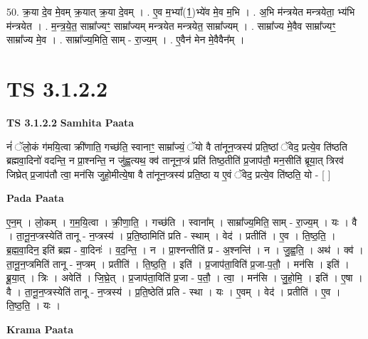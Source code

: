 \documentclass[17pt]{extarticle}
\begin{document}
50. क्र॒या दे॒व मे॒वम् क्र॒यात् क्र॒या दे॒वम् । . ए॒व म॒भ्या᳚(1॒)भ्ये॑व मे॒व म॒भि । . अ॒भि म॑न्त्रयेत मन्त्रयेता॒ भ्य॑भि म॑न्त्रयेत । . म॒न्त्र॒ये॒त॒ साम्रा᳚ज्यꣳ॒॒ साम्रा᳚ज्यम् मन्त्रयेत मन्त्रयेत॒ साम्रा᳚ज्यम् । . साम्रा᳚ज्य मे॒वैव साम्रा᳚ज्यꣳ॒॒ साम्रा᳚ज्य मे॒व । . साम्रा᳚ज्य॒मिति॒ साम् - रा॒ज्य॒म् । . ए॒वैन॑ मेन मे॒वैवैन᳚म् । \newline
\pagebreak
{}

\section{ TS 3.1.2.2 }

\textbf{TS 3.1.2.2 } \newline
\textbf{Samhita Paata} \newline

नं॑ ॅलो॒कं ग॑मयि॒त्वा क्री॑णाति॒ गच्छ॑ति॒ स्वानाꣳ॒॒ साम्रा᳚ज्यं॒ ॅयो वै ता॑नून॒प्त्रस्य॑ प्रति॒ष्ठां ॅवेद॒ प्रत्ये॒व ति॑ष्ठति ब्रह्मवा॒दिनो॑ वदन्ति॒ न प्रा॒श्नन्ति॒ न जु॑ह्व॒त्यथ॒ क्व॑ तानून॒प्त्रं प्रति॑ तिष्ठ॒तीति॑ प्र॒जाप॑तौ॒ मन॒सीति॑ ब्रूया॒त् त्रिरव॑ जिघ्रेत् प्र॒जाप॑तौ त्वा॒ मन॑सि जुहो॒मीत्ये॒षा वै ता॑नून॒प्त्रस्य॑ प्रति॒ष्ठा य ए॒वं ॅवेद॒ प्रत्ये॒व ति॑ष्ठति॒ यो - [  ] \newline

\textbf{Pada Paata} \newline

ए॒न॒म् । लो॒कम् । ग॒म॒यि॒त्वा । क्री॒णा॒ति॒ । गच्छ॑ति । स्वाना᳚म् । साम्रा᳚ज्य॒मिति॒ साम् - रा॒ज्य॒म् । यः । वै । ता॒नू॒न॒प्त्रस्येति॑ तानू - न॒प्त्रस्य॑ । प्र॒ति॒ष्ठामिति॑ प्रति - स्थाम् । वेद॑ । प्रतीति॑ । ए॒व । ति॒ष्ठ॒ति॒ । ब्र॒ह्म॒वा॒दिन॒ इति॑ ब्रह्म - वा॒दिनः॑ । व॒द॒न्ति॒ । न । प्रा॒श्नन्तीति॑ प्र - अ॒श्नन्ति॑ । न । जु॒ह्व॒ति॒ । अथ॑ । क्व॑ । ता॒नू॒न॒प्त्रमिति॑ तानू - न॒प्त्रम् । प्रतीति॑ । ति॒ष्ठ॒ति॒ । इति॑ । प्र॒जाप॑ता॒विति॑ प्र॒जा-प॒तौ॒ । मन॑सि । इति॑ । ब्रू॒या॒त् । त्रिः । अवेति॑ । जि॒घ्रे॒त् । प्र॒जाप॑ता॒विति॑ प्र॒जा - प॒तौ॒ । त्वा॒ । मन॑सि । जु॒हो॒मि॒ । इति॑ । ए॒षा । वै । ता॒नू॒न॒प्त्रस्येति॑ तानू - न॒प्त्रस्य॑ । प्र॒ति॒ष्ठेति॑ प्रति - स्था । यः । ए॒वम् । वेद॑ । प्रतीति॑ । ए॒व । ति॒ष्ठ॒ति॒ । यः ।  \newline


\textbf{Krama Paata} \newline
\end{document}
